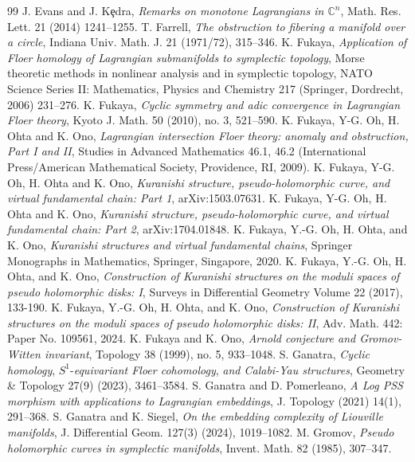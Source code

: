 \documentclass[a4paper]{article}
\numberwithin{equation}{section}
\begin{document}
\begin{thebibliography}{99}
J. Evans and J. K\c{e}dra, \textit{Remarks on monotone Lagrangians in $\mathbb{C}^n$}, Math. Res. Lett. 21 (2014) 1241--1255.
T. Farrell, \textit{The obstruction to fibering a manifold over a circle}, Indiana Univ. Math. J. 21 (1971/72), 315--346.
K. Fukaya, \textit{Application of Floer homology of Lagrangian submanifolds to symplectic topology}, Morse theoretic methods in nonlinear analysis and in symplectic topology, NATO Science Series II: Mathematics, Physics and Chemistry 217 (Springer, Dordrecht, 2006) 231--276.
 K. Fukaya, \textit{Cyclic symmetry and adic convergence in Lagrangian Floer theory}, Kyoto J. Math. 50 (2010), no. 3, 521--590.
K. Fukaya, Y-G. Oh, H. Ohta and K. Ono, \textit{Lagrangian intersection Floer theory: anomaly and obstruction, Part I and II}, Studies in Advanced Mathematics 46.1, 46.2 (International Press/American Mathematical Society, Providence, RI, 2009).
K. Fukaya, Y-G. Oh, H. Ohta and K. Ono, \textit{Kuranishi structure, pseudo-holomorphic curve, and virtual fundamental chain: Part 1}, arXiv:1503.07631.
K. Fukaya, Y-G. Oh, H. Ohta and K. Ono, \textit{Kuranishi structure, pseudo-holomorphic curve, and virtual fundamental chain: Part 2}, arXiv:1704.01848.
K. Fukaya, Y.-G. Oh, H. Ohta, and K. Ono, \textit{Kuranishi structures and virtual fundamental chains}, Springer Monographs in Mathematics, Springer, Singapore, 2020.
K. Fukaya, Y.-G. Oh, H. Ohta, and K. Ono, \textit{Construction of Kuranishi structures on the moduli spaces of pseudo holomorphic disks: I}, Surveys in Differential Geometry Volume 22 (2017), 133-190.
K. Fukaya, Y.-G. Oh, H. Ohta, and K. Ono, \textit{Construction of Kuranishi structures on the moduli spaces of pseudo holomorphic disks: II}, Adv. Math. 442: Paper No. 109561, 2024.
K. Fukaya and K. Ono, \textit{Arnold conjecture and Gromov-Witten invariant}, Topology 38 (1999), no. 5, 933--1048.
S. Ganatra, \textit{Cyclic homology}, $S^1$-\textit{equivariant Floer cohomology}, \textit{and Calabi-Yau structures}, Geometry \& Topology 27(9) (2023), 3461--3584.
S. Ganatra and D. Pomerleano, \textit{A Log PSS morphism with applications to Lagrangian embeddings}, J. Topology (2021) 14(1), 291--368.
S. Ganatra and K. Siegel, \textit{On the embedding complexity of Liouville manifolds}, J. Differential Geom. 127(3) (2024), 1019--1082.
M. Gromov, \textit{Pseudo holomorphic curves in symplectic manifolds}, Invent. Math. 82 (1985), 307--347.

\end{thebibliography}
\end{document}
